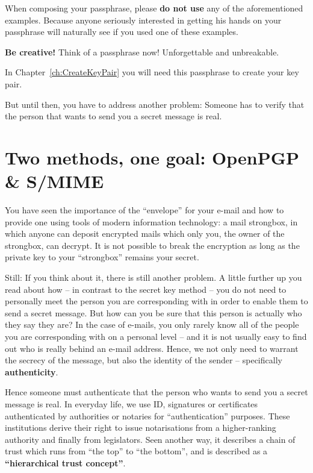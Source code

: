 \documentclass[a4paper,11pt,oneside,openright,titlepage]{scrbook}
\newcommand{\Email}{e-mail}
\begin{document}
When composing your passphrase, please \textbf{do not use} any of the
aforementioned examples. Because anyone seriously interested in
getting his hands on your passphrase will naturally see if you used
one of these examples.

\bigskip

\textbf{Be creative!} Think of a passphrase now! Unforgettable and unbreakable.

In Chapter~\ref{ch:CreateKeyPair} you will need this passphrase to create your key pair.

But until then, you have to address another problem: Someone has to
verify that the person that wants to send you a secret message is
real.


\clearpage
\chapter{Two methods, one goal: OpenPGP \& S/MIME}
\label{ch:openpgpsmime}
 

You have seen the importance of the ``envelope'' for your
\Email{} and how to provide one
using tools of modern information technology: a mail
strongbox, in which anyone can deposit encrypted
mails which only you, the owner of the strongbox, can decrypt. It is
not possible to break the encryption as long as the private key to
your ``strongbox'' remains your secret.

Still: If you think about it, there is still another problem. A little
further up you read about how -- in contrast to the secret key method
-- you do not need to personally meet the person you are corresponding
with in order to enable them to send a secret message. But how can you
be sure that this person is actually who they say they
are? In the case of \Email{}s, you
only rarely know all of the people you are corresponding with on a
personal level -- and it is not usually easy to find out who is really
behind an \Email{} address. Hence, we not only
need to warrant the secrecy of the message, but also the identity of
the sender -- specifically \textbf{authenticity}. 

Hence someone must authenticate that the person who wants to send you
a secret message is real. In everyday life, we use ID, signatures or
certificates authenticated by authorities or notaries for
 ``authentication'' purposes. These
institutions derive their right to issue notarisations from a
higher-ranking authority and finally from legislators. Seen another
way, it describes a chain of trust which
runs  from ``the top'' to ``the bottom'', and is
described as a \textbf{``hierarchical trust concept''}.
\end{document}

